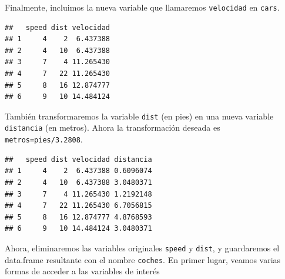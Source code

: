\documentclass[]{book}
\newenvironment{Shaded}{\begin{snugshade}}{\end{snugshade}}
\newcommand{\KeywordTok}[1]{\textcolor[rgb]{0.13,0.29,0.53}{\textbf{#1}}}
\newcommand{\FloatTok}[1]{\textcolor[rgb]{0.00,0.00,0.81}{#1}}
\newcommand{\StringTok}[1]{\textcolor[rgb]{0.31,0.60,0.02}{#1}}
\newcommand{\OperatorTok}[1]{\textcolor[rgb]{0.81,0.36,0.00}{\textbf{#1}}}
\newcommand{\NormalTok}[1]{#1}
\begin{document}
\begin{Shaded}
\end{Shaded}

Finalmente, incluimos la nueva variable que llamaremos
\texttt{velocidad} en \texttt{cars}.

\begin{Shaded}
\end{Shaded}

\begin{verbatim}
##   speed dist velocidad
## 1     4    2  6.437388
## 2     4   10  6.437388
## 3     7    4 11.265430
## 4     7   22 11.265430
## 5     8   16 12.874777
## 6     9   10 14.484124
\end{verbatim}

También transformaremos la variable \texttt{dist} (en pies) en una nueva
variable \texttt{distancia} (en metros). Ahora la transformación deseada
es \texttt{metros=pies/3.2808}.

\begin{Shaded}
\end{Shaded}

\begin{verbatim}
##   speed dist velocidad distancia
## 1     4    2  6.437388 0.6096074
## 2     4   10  6.437388 3.0480371
## 3     7    4 11.265430 1.2192148
## 4     7   22 11.265430 6.7056815
## 5     8   16 12.874777 4.8768593
## 6     9   10 14.484124 3.0480371
\end{verbatim}

Ahora, eliminaremos las variables originales \texttt{speed} y
\texttt{dist}, y guardaremos el data.frame resultante con el nombre
\texttt{coches}. En primer lugar, veamos varias formas de acceder a las
variables de interés
\end{document}
